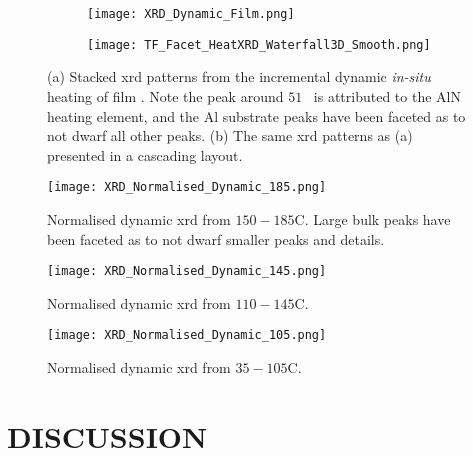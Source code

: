 \documentclass[draft,a4paper,12pt,oneside]{article}%
\begin{document}
\begin{figure}[b]
	\centering
	\begin{subfigure}[htbp]{0.75\textwidth}
		\texttt{[image: XRD\_Dynamic\_Film.png]}
		\caption{}
		\label{fig:XRD_Dynamic_FullStack_Film}
	\end{subfigure}
	\begin{subfigure}[htbp]{0.75\textwidth}
		\texttt{[image: TF\_Facet\_HeatXRD\_Waterfall3D\_Smooth.png]}
		\caption{}
		\label{fig:XRD_Dynamic_WaterFall_Film}
	\end{subfigure}
	\caption{(a) Stacked \acrshort{xrd} patterns from the incremental dynamic \textit{in-situ} heating of film \MgZnCa. Note the peak around $51$\degree~ is attributed to the AlN heating element, and the Al substrate peaks have been faceted as to not dwarf all other peaks. (b) The same \acrshort{xrd} patterns as (a) presented in a cascading layout.}%
	\label{fig:XRD_Dynamic_Film}
\end{figure}

\begin{figure}[b]
	\centering
	\texttt{[image: XRD\_Normalised\_Dynamic\_185.png]}
	\caption[Table of contents Capition]{Normalised dynamic \acrshort{xrd} from $150-185$\degree C. Large bulk peaks have been faceted as to not dwarf smaller peaks and details.}%
	\label{fig:XRD_Dynamic_185}
\end{figure}

\begin{figure}[b]
	\centering
	\texttt{[image: XRD\_Normalised\_Dynamic\_145.png]}
	\caption[Table of contents Capition]{Normalised dynamic \acrshort{xrd} from $110-145$\degree C.}%
	\label{fig:XRD_Dynamic_145}
\end{figure}

\begin{figure}[b]
	\centering
	\texttt{[image: XRD\_Normalised\_Dynamic\_105.png]}
	\caption[Table of contents Capition]{Normalised dynamic \acrshort{xrd} from $35-105$\degree C.}%
	\label{fig:XRD_Dynamic_105}
\end{figure}


\section{DISCUSSION}
\end{document}
